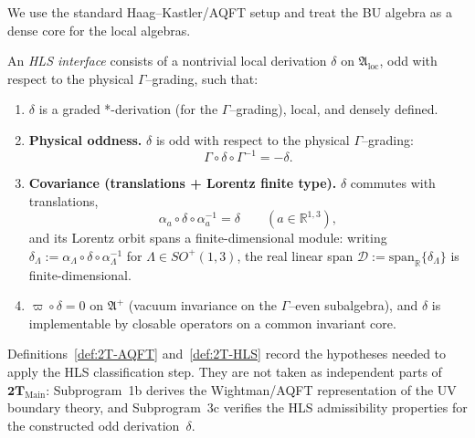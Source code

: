 \begin{remark}
We use the standard Haag--Kastler/AQFT setup \cite{HaagKastler1964} and treat
the BU algebra as a dense core for the local algebras.
\end{remark}

\begin{definition}
\label{def:2T-HLS}
An \emph{HLS interface} consists of a nontrivial local derivation $\delta$ on
$\mathfrak A_{\mathrm{loc}}$, odd with respect to the physical $\Gamma$--grading, such that:
\begin{enumerate}[label=\textbf{(H\arabic*)},leftmargin=*,itemsep=0.4em]
\item $\delta$ is a graded *-derivation (for the $\Gamma$--grading), local, and densely defined.
\item \textbf{Physical oddness.} $\delta$ is odd with respect to the physical $\Gamma$--grading:
  \[
  \Gamma\circ\delta\circ\Gamma^{-1}=-\delta.
  \]
\item \textbf{Covariance (translations + Lorentz finite type).}
  $\delta$ commutes with translations,
  \[
  \alpha_a\circ\delta\circ\alpha_a^{-1}=\delta\qquad(a\in\mathbb R^{1,3}),
  \]
  and its Lorentz orbit spans a finite-dimensional module: writing
  $\delta_\Lambda:=\alpha_\Lambda\circ\delta\circ\alpha_\Lambda^{-1}$ for
  $\Lambda\in SO^+(1,3)$, the real linear span
  $\mathscr D:=\mathrm{span}_{\mathbb R}\{\delta_\Lambda\}$ is finite-dimensional.
\item $\varpi\circ\delta=0$ on $\mathfrak A^{+}$ (vacuum invariance on the
  $\Gamma$--even subalgebra), and $\delta$ is implementable by closable operators
  on a common invariant core.
\end{enumerate}
\end{definition}

\begin{remark}
Definitions~\ref{def:2T-AQFT} and~\ref{def:2T-HLS} record the hypotheses needed
to apply the HLS classification step. They are not taken as independent parts of
\(\mathbf{2T}_{\mathrm{Main}}\): Subprogram~1b derives the Wightman/AQFT
representation of the UV boundary theory, and Subprogram~3c verifies the HLS
admissibility properties for the constructed odd derivation~\(\delta\).
\end{remark}

